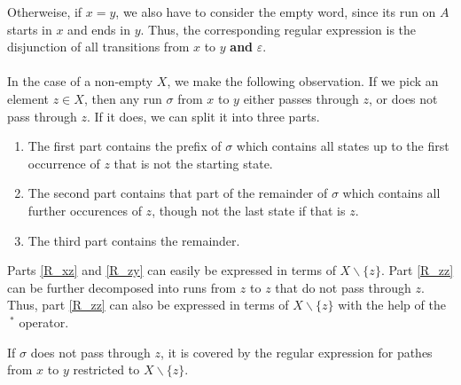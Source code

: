 Otherweise, if $x = y$, we also have to consider the empty word, since its run on $A$ starts in $x$ and ends in $y$.
Thus, the corresponding regular expression is the disjunction of all transitions from $x$ to $y$ \textbf{and} $\varepsilon$.

\paragraph{}
In the case of a non-empty $X$, we make the following observation. 
If we pick an element $z \in X$, then any run $\sigma$ from $x$ to $y$ either passes through $z$, or does not pass through $z$.
If it does, we can split it into three parts.
\begin{enumerate}[label=(\roman*)]
    \item  \label{R_xz}
        The first part contains the prefix of $\sigma$ which contains all states up to the first occurrence of $z$ that is not the starting state.
    \item  \label{R_zz}
        The second part contains that part of the remainder of $\sigma$ which contains all further occurences of $z$, though not the last state if that is $z$.
    \item  \label{R_zy}
        The third part contains the remainder.
\end{enumerate}

Parts \ref{R_xz} and \ref{R_zy} can easily be expressed in terms of $X\backslash\{z\}$.
Part \ref{R_zz} can be further decomposed into runs from $z$ to $z$ that do not pass through $z$.
Thus, part \ref{R_zz} can also be expressed in terms of $X\backslash\{z\}$ with the help of the $\ ^*$ operator.

If $\sigma$ does not pass through $z$, it is covered by the regular expression for pathes from $x$ to $y$ restricted to $X\backslash\{z\}$.


